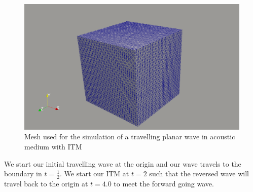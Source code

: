 \begin{figure}
    \centering
    \includegraphics[width=\linewidth]{figures/mesh_cube.png}
    \caption{Mesh used for the simulation of a travelling planar wave in acoustic medium with \ac{ITM}}
    \label{fig:acoustic_mesh}
\end{figure}

We start our initial travelling wave at the origin and our wave travels to the boundary in $t = \frac{1}{2}$. We start our \ac{ITM} at $t=2$ such that the reversed wave will travel back to the origin at $t=4.0$ to meet the
forward going wave. 

